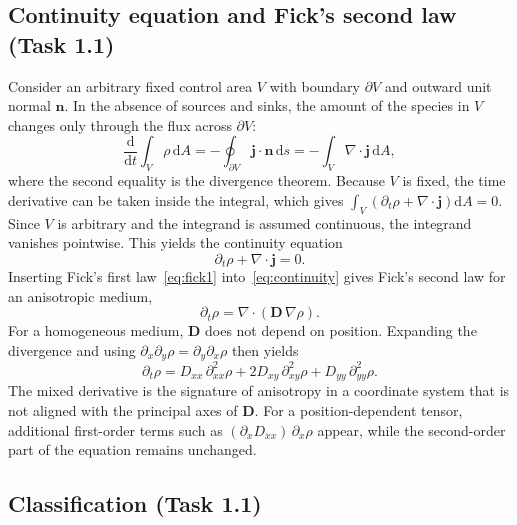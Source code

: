 \documentclass[11pt,a4paper]{article}
\numberwithin{equation}{section}
\theoremstyle{definition}
\theoremstyle{remark}
\newcommand{\grad}{\nabla}
\newcommand{\bj}{\bm{j}}
\newcommand{\bn}{\bm{n}}
\newcommand{\bD}{\mathbf{D}}
\begin{document}
\subsection{Continuity equation and Fick's second law (Task 1.1)}\label{sec:fick2}

Consider an arbitrary fixed control area $V$ with boundary $\partial V$ and outward unit
normal $\bn$. In the absence of sources and sinks, the amount of the species in $V$
changes only through the flux across $\partial V$:
\begin{equation}\label{eq:balance}
  \frac{\mathrm{d}}{\mathrm{d}t}\int_V \rho \,\mathrm{d}A
  = -\oint_{\partial V} \bj\cdot\bn \,\mathrm{d}s
  = -\int_V \grad\cdot\bj \,\mathrm{d}A,
\end{equation}
where the second equality is the divergence theorem. Because $V$ is fixed, the time
derivative can be taken inside the integral, which gives
$\int_V \left(\partial_t\rho + \grad\cdot\bj\right)\mathrm{d}A = 0$. Since $V$ is
arbitrary and the integrand is assumed continuous, the integrand vanishes pointwise. This
yields the continuity equation
\begin{equation}\label{eq:continuity}
  \partial_t\rho + \grad\cdot\bj = 0.
\end{equation}
Inserting Fick's first law~\eqref{eq:fick1} into~\eqref{eq:continuity} gives Fick's
second law for an anisotropic medium,
\begin{equation}\label{eq:fick2}
  \partial_t\rho = \grad\cdot\left(\bD\,\grad\rho\right).
\end{equation}
For a homogeneous medium, $\bD$ does not depend on position. Expanding the divergence
and using $\partial_x\partial_y\rho = \partial_y\partial_x\rho$ then yields
\begin{equation}\label{eq:fick2-expanded}
  \boxed{\;
    \partial_t\rho
    = D_{xx}\,\partial^2_{xx}\rho + 2D_{xy}\,\partial^2_{xy}\rho + D_{yy}\,\partial^2_{yy}\rho.
  \;}
\end{equation}
The mixed derivative is the signature of anisotropy in a coordinate system that is not
aligned with the principal axes of $\bD$. For a position-dependent tensor, additional
first-order terms such as $(\partial_x D_{xx})\,\partial_x\rho$ appear, while the
second-order part of the equation remains unchanged.

\subsection{Classification (Task 1.1)}\label{sec:classification}
\end{document}
